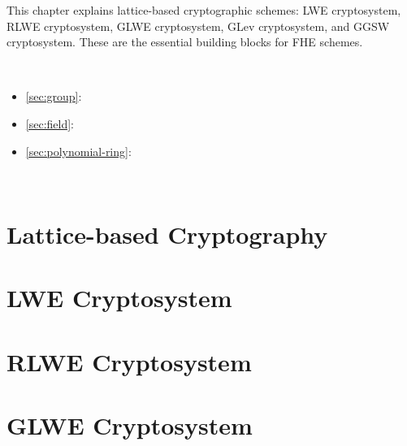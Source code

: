 \documentclass[11pt]{article}
\begin{document}
\renewcommand{\thesection}{B-\arabic{section}}
\setcounter{section}{0}

This chapter explains lattice-based cryptographic schemes: LWE cryptosystem, RLWE cryptosystem, GLWE cryptosystem, GLev cryptosystem, and GGSW cryptosystem. These are the essential building blocks for FHE schemes. 


$ $

\begin{tcolorbox}[
    title = \textbf{Required Background},    %
    colback = white,    %
    colframe = black,  %
    boxrule = 0.8pt,     %
    left = 1mm, right = 1mm, top = 1mm, bottom = 1mm %
]



\begin{itemize}
\item \autoref{sec:group}: 
\item \autoref{sec:field}: 
\item \autoref{sec:polynomial-ring}: 
\end{itemize}

\end{tcolorbox}

$ $

\clearpage

\section{Lattice-based Cryptography}
\label{sec:lattice}


\clearpage

\section{LWE Cryptosystem}
\label{sec:lwe}


\clearpage

\section{RLWE Cryptosystem}
\label{sec:rlwe}


\clearpage

\section{GLWE Cryptosystem} 
\label{sec:glwe}

\end{document}
